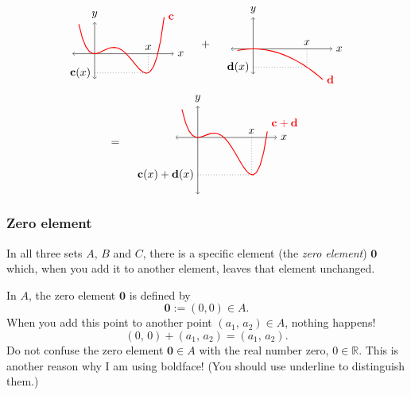 \documentclass[a4paper,11pt]{book}
\theoremstyle{definition}
\newcommand{\be}{\begin{equation}}
\newcommand{\ee}{\end{equation}}
\newcommand{\ve}[1]{\mathbf{#1}}
\begin{document}
\begin{multline*}
\begin{tikzpicture}[baseline={([yshift=-.5ex]current bounding box.center)},vertex/.style={anchor=base,
	circle,fill=black!25,minimum size=18pt,inner sep=2pt},domain=-0.5:2.2]
 	\draw[<->] (-0.7, 0) -- (2.5,0) node[right] {$x$};
 	\draw[<->] (0, -0.8) -- (0, 1) node[above] {$y$};    
    \draw[color=red, thick] plot[id=p] (\x, {(\x-2)*\x*\x*(\x-1)})
        node[right] {$\ve{c}$};
    \draw[dotted]  (1.7, 0)  node[above] {$x$} -- (1.7, -0.6069);
    \draw[dotted]  (0, -0.6069)  node[left] {$\ve{c}(x)$} -- (1.7, -0.6069);
\end{tikzpicture}
\quad + \quad
\begin{tikzpicture}[baseline={([yshift=-.5ex]current bounding box.center)},vertex/.style={anchor=base,
	circle,fill=black!25,minimum size=18pt,inner sep=2pt},domain=-0.5:2.2]
 	\draw[<->] (-0.7, 0) -- (2.5,0) node[right] {$x$};
 	\draw[<->] (0, -0.8) -- (0, 1) node[above] {$y$};    
    \draw[color=red, thick] plot[id=p] (\x ,{-0.2*\x*\x})
        node[right] {$\ve{d}$};
   \draw[dotted]  (1.7, 0)  node[above] {$x$} -- (1.7, -0.578);
    \draw[dotted]  (0, -0.578)  node[left] {$\ve{d}(x)$} -- (1.7, -0.578);
\end{tikzpicture} \\ = \quad
\begin{tikzpicture}[baseline={([yshift=-.5ex]current bounding box.center)},vertex/.style={anchor=base,
	circle,fill=black!25,minimum size=18pt,inner sep=2pt},domain=-0.5:2.2]
 	\draw[<->] (-0.7, 0) -- (2.5,0) node[right] {$x$};
 	\draw[<->] (0, -1.8) -- (0, 1) node[above] {$y$};    
    \draw[color=red, thick] plot[id=p] (\x,{(\x-2)*\x*\x*(\x-1) - 0.2*\x* \x})
        node[above right] {$\ve{c}+\ve{d}$};
   \draw[dotted]  (1.7, 0)  node[above] {$x$} -- (1.7, -1.1849);
    \draw[dotted]  (0, -1.1849)  node[left] {$\ve{c}(x) + \ve{d}(x)$} -- (1.7, -1.1849);       
\end{tikzpicture}
\end{multline*}

\subsubsection{Zero element}
In all three sets $A$, $B$ and $C$, there is a specific element (the {\em zero element}) $\ve{0}$ which, when you add it to another element, leaves that element unchanged. 

In $A$, the zero element $\ve{0}$ is defined by
\be \label{zero_in_A}
 \ve{0} := (0,0) \in A.
\ee
When you add this point to another point $(a_1, \, a_2) \in A$, nothing happens! 
\[ 
 (0, \,0) + (a_1, \, a_2) = (a_1, \, a_2).
\]
Do not confuse the zero element $\ve{0} \in A$ with the real number zero, $0 \in \mathbb{R}$. This is another reason why I am using boldface! (You should use underline to distinguish them.)
\end{document}
